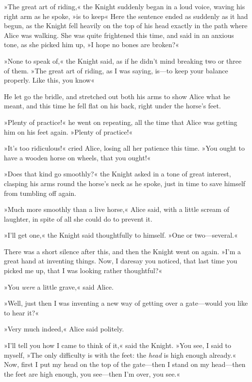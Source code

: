 »The great art of riding,« the Knight suddenly began in a loud voice, waving his right arm as he spoke, »is to keep\longdash« Here the sentence ended as suddenly as it had begun, as the Knight fell heavily on the top of his head exactly in the path where Alice was walking. She was quite frightened this time, and said in an anxious tone, as she picked him up, »I hope no bones are broken?«

»None to speak of,« the Knight said, as if he didn't mind breaking two or three of them. »The great art of riding, as I was saying, is—to keep your balance properly. Like this, you know\longdash«

He let go the bridle, and stretched out both his arms to show Alice what he meant, and this time he fell flat on his back, right under the horse's feet.

»Plenty of practice!« he went on repeating, all the time that Alice was getting him on his feet again. »Plenty of practice!«

»It's too ridiculous!« cried Alice, losing all her patience this time. »You ought to have a wooden horse on wheels, that you ought!«

»Does that kind go smoothly?« the Knight asked in a tone of great interest, clasping his arms round the horse's neck as he spoke, just in time to save himself from tumbling off again.

»Much more smoothly than a live horse,« Alice said, with a little scream of laughter, in spite of all she could do to prevent it.

»I'll get one,« the Knight said thoughtfully to himself. »One or two—several.«

There was a short silence after this, and then the Knight went on again. »I'm a great hand at inventing things. Now, I daresay you noticed, that last time you picked me up, that I was looking rather thoughtful?«

»You \textit{were} a little grave,« said Alice.

»Well, just then I was inventing a new way of getting over a gate—would you like to hear it?«

»Very much indeed,« Alice said politely.

»I'll tell you how I came to think of it,« said the Knight. »You see, I said to myself, »The only difficulty is with the feet: the \textit{head} is high enough already.« Now, first I put my head on the top of the gate—then I stand on my head—then the feet are high enough, you see—then I'm over, you see.«

